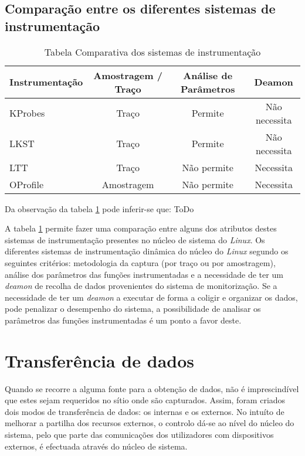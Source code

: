 \subsection{Comparação entre os diferentes sistemas de instrumentação}
\begin{table}[h!]
\begin{center}
\caption{Tabela Comparativa dos sistemas de instrumentação}
\label{tab:inst_compare}
\begin{tabular}{|l||c|c|c|}
\hline
Instrumentação & Amostragem / Traço & Análise de Parâmetros & Deamon \\
\hline
KProbes & Traço & Permite & Não necessita \\
\hline
LKST & Traço & Permite & Não necessita \\
\hline
LTT & Traço & Não permite & Necessita \\
\hline
OProfile & Amostragem & Não permite & Necessita \\
\hline


\end{tabular}
\end{center}
\end{table}

Da observação da tabela \ref{tab:inst_compare} pode inferir-se que: ToDo

A tabela \ref{tab:inst_compare} permite fazer uma comparação entre alguns dos atributos destes sistemas de instrumentação presentes no núcleo de sistema do \textit{Linux}.
Os diferentes sistemas de instrumentação dinâmica do núcleo do \textit{Linux} segundo os seguintes critérios: metodologia da captura (por traço ou por amostragem), análise dos parâmetros das funções instrumentadas e a necessidade de ter um \textit{deamon} de recolha de dados provenientes do sistema de monitorização.
Se a necessidade de ter um \textit{deamon} a executar de forma a coligir e organizar os dados, pode penalizar o desempenho do sistema, a possibilidade de analisar os parâmetros das funções instrumentadas é um ponto a favor deste.

\section{Transferência de dados}
\label{sect:kernel_user_comm}

Quando se recorre a alguma fonte para a obtenção de dados, não é imprescindível que estes sejam requeridos no sítio onde são capturados.
Assim, foram criados dois modos de transferência de dados: os internas e os externos.
No intuíto de melhorar a partilha dos recursos externos, o controlo dá-se ao nível do núcleo do sistema, pelo que parte das comunicações dos utilizadores com dispositivos externos, é efectuada através do núcleo de sistema.

